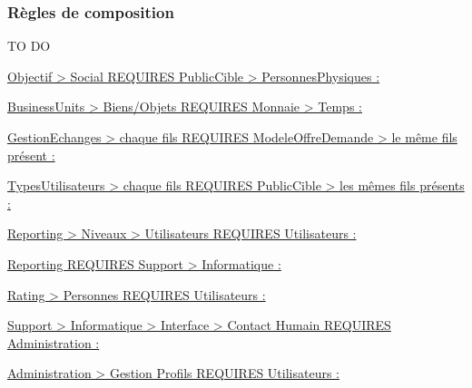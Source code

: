 \subsubsection{Règles de composition}

TO DO 

\underline{Objectif > Social REQUIRES PublicCible > PersonnesPhysiques : }

\underline{BusinessUnits > Biens/Objets REQUIRES Monnaie > Temps : }

\underline{GestionEchanges > chaque fils REQUIRES ModeleOffreDemande > le même fils présent : }

\underline{TypesUtilisateurs > chaque fils REQUIRES PublicCible > les mêmes fils présents : }

\underline{Reporting > Niveaux > Utilisateurs REQUIRES Utilisateurs : }

\underline{Reporting REQUIRES Support > Informatique : }

\underline{Rating > Personnes REQUIRES Utilisateurs : }

\underline{Support > Informatique > Interface > Contact Humain REQUIRES Administration : }

\underline{Administration > Gestion Profils REQUIRES Utilisateurs : }
